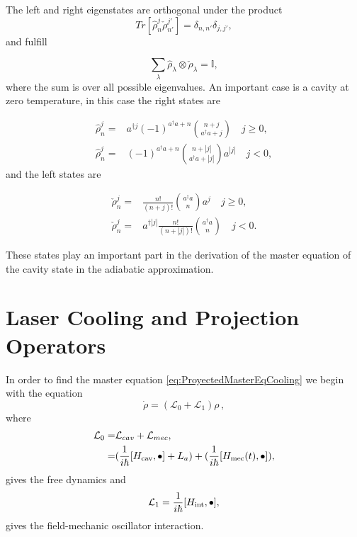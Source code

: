 \documentclass[reprint, amsmath,amssymb, aps,pra]{revtex4-1}
\begin{document}
The left and right eigenstates are orthogonal under the product
\begin{equation}
Tr[\hat{\rho}_n^j\check{\rho}_{n'}^{j'}] = \delta_{n,n'}\delta_{j,j'},
\end{equation} and fulfill

\begin{equation}\label{DampingBasisCompleteness}
\sum_{\lambda} \hat{\rho}_\lambda \otimes \check{\rho}_\lambda = \mathbb{I},
\end{equation} where the sum is over all possible eigenvalues. An important case is a cavity at zero temperature, in this case the right states are \cite{EnglertDB}

\begin{align}\label{DefDBZero}
\hat{\rho}_n^j=&a^{\dagger j}(-1)^{a^\dagger a + n}\binom{n+j}{a^\dagger a+j} \quad j \geq 0, \\
\hat{\rho}_n^j=&(-1)^{a^\dagger a + n}\binom{n+|j|}{a^\dagger a+|j|}a^{|j|} \quad j < 0,
\end{align} and the left states are

\begin{align}\label{DefDBDualZero}
\check{\rho}_n^j=&\frac{n!}{(n+j)!}\binom{a^\dagger a}{n}a^j \quad j \geq 0, \\
\check{\rho}_n^j=&a^{\dagger|j|}\frac{n!}{(n+|j|)!}\binom{a^\dagger a}{n} \quad j < 0.
\end{align}

These states play an important part in the derivation of the master
equation of the cavity state in the adiabatic approximation.

\section{Laser Cooling and Projection Operators}\label{CoolingAppendix}

In order to find the master equation
\eqref{eq:ProyectedMasterEqCooling} we begin with the equation 
\begin{equation}\label{eq:master_no_mechanical_damping}
\dot{\rho}=(\mathcal{L}_0+\mathcal{L}_1)\rho\, ,
\end{equation}
where
\begin{align}
\mathcal{L}_0=& \mathcal{L}_{cav} + \mathcal{L}_{mec},\\
 =&(\frac{1}{i\hbar}[H_{\rm cav},\bullet]+L_a) +(\frac{1}{i\hbar}[H_{\rm mec}(t),\bullet]), \nonumber
\end{align}
gives the free dynamics 
and
\begin{equation}
\mathcal{L}_1 = \frac{1}{i\hbar}[H_{\rm int},\bullet],
\end{equation}
gives the field-mechanic oscillator interaction.
\end{document}
